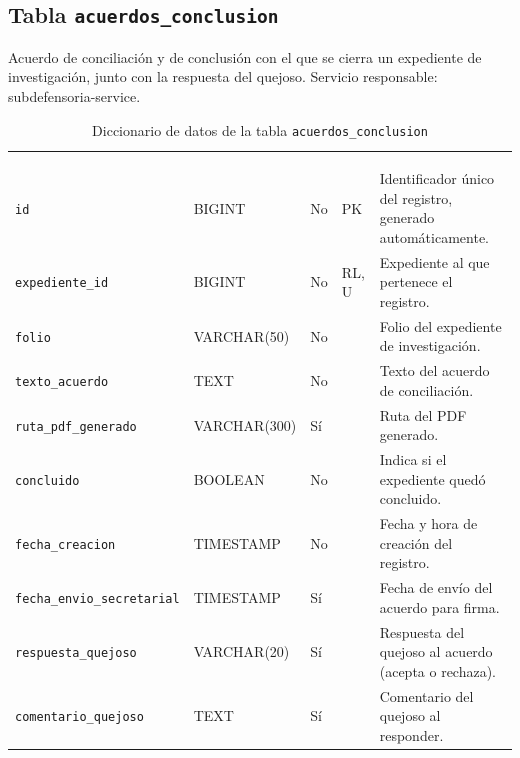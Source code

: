 \subsection{Tabla \texttt{acuerdos\_conclusion}}
Acuerdo de conciliación y de conclusión con el que se cierra un expediente de investigación, junto con la respuesta del quejoso. Servicio responsable: subdefensoria-service.


\footnotesize
\renewcommand{\arraystretch}{1.15}
\setlength{\tabcolsep}{4pt}
\begin{longtable}{|L{3.9cm}|L{2.4cm}|L{0.9cm}|L{1.2cm}|L{6.6cm}|}
	\hiderowcolors\caption{Diccionario de datos de la tabla \texttt{acuerdos\_conclusion}}
	\label{tab:dic_acuerdos_conclusion} \\ \showrowcolors
	\hline
	 &  &  &  &  \\
	\hline
	\endfirsthead
	\hline
	 &  &  &  &  \\
	\hline
	\endhead
		\texttt{id} & BIGINT & No & PK & Identificador único del registro, generado automáticamente. \\ \hline
		\texttt{expediente\_\allowbreak{}id} & BIGINT & No & RL, U & Expediente al que pertenece el registro. \\ \hline
		\texttt{folio} & VARCHAR(50) & No &  & Folio del expediente de investigación. \\ \hline
		\texttt{texto\_\allowbreak{}acuerdo} & TEXT & No &  & Texto del acuerdo de conciliación. \\ \hline
		\texttt{ruta\_\allowbreak{}pdf\_\allowbreak{}generado} & VARCHAR(300) & Sí &  & Ruta del PDF generado. \\ \hline
		\texttt{concluido} & BOOLEAN & No &  & Indica si el expediente quedó concluido. \\ \hline
		\texttt{fecha\_\allowbreak{}creacion} & TIMESTAMP & No &  & Fecha y hora de creación del registro. \\ \hline
		\texttt{fecha\_\allowbreak{}envio\_\allowbreak{}secretarial} & TIMESTAMP & Sí &  & Fecha de envío del acuerdo para firma. \\ \hline
		\texttt{respuesta\_\allowbreak{}quejoso} & VARCHAR(20) & Sí &  & Respuesta del quejoso al acuerdo (acepta o rechaza). \\ \hline
		\texttt{comentario\_\allowbreak{}quejoso} & TEXT & Sí &  & Comentario del quejoso al responder. \\ \hline

\end{longtable}
